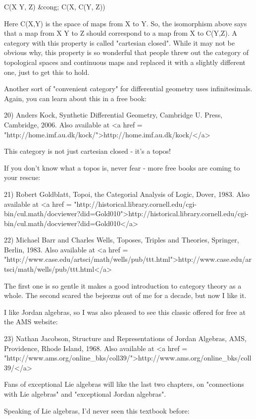 C(X \times  Y, Z) &cong; C(X, C(Y, Z))

Here C(X,Y) is the space of maps from X to Y.  So, the isomorphism
above says that a map from X \times  Y to Z should correspond to a map
from X to C(Y,Z).  A category with this property is called
"cartesian closed".  While it may not be obvious why,
this property is so wonderful that people threw out the
category of topological spaces and continuous maps and replaced it
with a slightly different one, just to get this to hold.

Another sort of "convenient category" for differential
geometry uses infinitesimals.  Again, you can learn about this in a
free book:

20) Anders Kock, Synthetic Differential Geometry, Cambridge U. Press,
Cambridge, 2006.  Also available at <a href = "http://home.imf.au.dk/kock/">http://home.imf.au.dk/kock/</a>

This category is not just cartesian closed - it's a topos!

If you don't know what a topos is, never fear - more free books are
coming to your rescue:

21) Robert Goldblatt, Topoi, the Categorial Analysis of Logic, 
Dover, 1983.  Also available at 
<a href = "http://historical.library.cornell.edu/cgi-bin/cul.math/docviewer?did=Gold010">http://historical.library.cornell.edu/cgi-bin/cul.math/docviewer?did=Gold010</a>

22) Michael Barr and Charles Wells, Toposes, Triples and Theories,
Springer, Berlin, 1983.   Also available at
<a href = "http://www.case.edu/artsci/math/wells/pub/ttt.html">http://www.case.edu/artsci/math/wells/pub/ttt.html</a>

The first one is so gentle it makes a good introduction to category 
theory as a whole.  The second scared the bejeezus out of me for a 
decade, but now I like it.

I like Jordan algebras, so I was also pleased to see this classic
offered for free at the AMS website:

23) Nathan Jacobson, Structure and Representations of Jordan Algebras,
AMS, Providence, Rhode Island, 1968.  Also available at 
<a href = "http://www.ams.org/online_bks/coll39/">http://www.ams.org/online_bks/coll39/</a>

Fans of exceptional Lie algebras will like the last two chapters, on
"connections with Lie algebras" and "exceptional Jordan algebras".

Speaking of Lie algebras, I'd never seen this textbook before:

